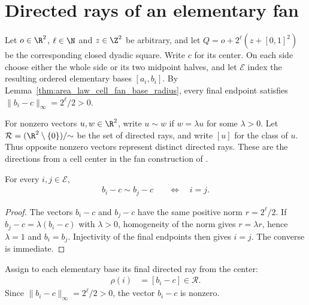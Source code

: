 \section{Directed rays of an elementary fan}
\label{sec:area_law_cell_fan_rays}

Let $o\in\R^2$, $\ell\in\N$ and $z\in\Z^2$ be arbitrary, and let
$Q=o+2^\ell(z+[0,1]^2)$ be the corresponding closed dyadic square.
Write $c$ for its center. On each side choose either the whole side or
its two midpoint halves, and let $\mathcal E$ index the resulting
ordered elementary bases $[a_i,b_i]$.
By Lemma~\ref{thm:area_law_cell_fan_base_radius}, every final endpoint
satisfies $\|b_i-c\|_\infty=2^\ell/2>0$.

For nonzero vectors $u,w\in\R^2$, write $u\sim w$ if
$w=\lambda u$ for some $\lambda>0$. Let
$\mathcal R=(\R^2\setminus\{0\})/{\sim}$ be the set of directed rays,
and write $[u]$ for the class of $u$.
Thus opposite nonzero vectors represent distinct directed rays.
These are the directions from a cell center in the fan construction of
\cite[Section~11]{OpenAI2026AreaLaw}.


\begin{lemma}
    \label{thm:area_law_cell_fan_end_same_ray}
    \leanok
    For every $i,j\in\mathcal E$,
    \begin{align}
        b_i-c\sim b_j-c & \quad\Longleftrightarrow\quad i=j.
    \end{align}
\end{lemma}
\begin{proof}\leanok
    The vectors $b_i-c$ and $b_j-c$ have the same positive norm $r=2^\ell/2$.
    If $b_j-c=\lambda(b_i-c)$ with $\lambda>0$, homogeneity of the
    norm gives $r=\lambda r$, hence $\lambda=1$ and $b_i=b_j$.
    Injectivity of the final endpoints
    then gives $i=j$. The converse is immediate.
\end{proof}

\begin{definition}
    \label{def:area_law_cell_fan_ray}
    \leanok
    Assign to each elementary base its final directed ray from the
    center:
    \begin{align}
        \rho(i) & =[b_i-c]\in\mathcal R.
    \end{align}
    Since $\|b_i-c\|_\infty=2^\ell/2>0$, the vector $b_i-c$ is nonzero.
\end{definition}


